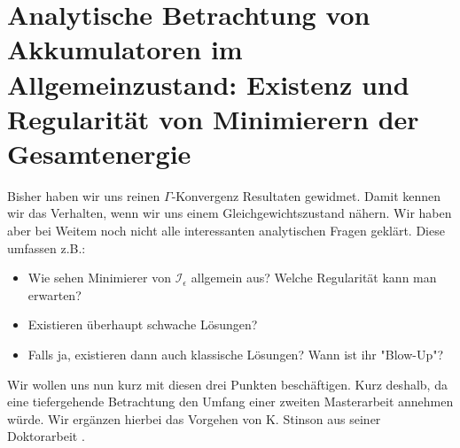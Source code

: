 \section{Analytische Betrachtung von Akkumulatoren im Allgemeinzustand: Existenz und Regularität von Minimierern der Gesamtenergie}{\label{sec:regumini}}
Bisher haben wir uns reinen \(\Gamma\)-Konvergenz Resultaten gewidmet. Damit kennen wir das Verhalten, wenn wir uns einem Gleichgewichtszustand nähern. Wir haben aber bei Weitem noch nicht alle interessanten analytischen Fragen geklärt. Diese umfassen z.B.:
\begin{itemize}
    \item Wie sehen Minimierer von \(\mathcal{I}_{\epsilon}\) allgemein aus? Welche Regularität kann man erwarten?
    \item Existieren überhaupt schwache Lösungen?
    \item Falls ja, existieren dann auch klassische Lösungen? Wann ist ihr "Blow-Up"?
\end{itemize}
Wir wollen uns nun kurz mit diesen drei Punkten beschäftigen. Kurz deshalb, da eine tiefergehende Betrachtung den Umfang einer zweiten Masterarbeit annehmen würde. Wir ergänzen hierbei das Vorgehen von K. Stinson aus seiner Doktorarbeit \cite{stinson2021analysis}.\\

